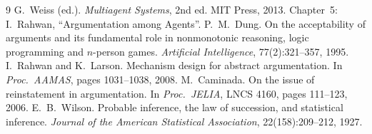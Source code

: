 \documentclass[11pt,a4paper]{article}
\theoremstyle{definition}
\begin{document}
\begin{thebibliography}{9}
 G.~Weiss (ed.). \emph{Multiagent Systems}, 2nd ed. MIT Press, 2013.
  Chapter~5: I.~Rahwan, ``Argumentation among Agents''.
 P.~M.~Dung. On the acceptability of arguments and its fundamental role in
  nonmonotonic reasoning, logic programming and $n$-person games. \emph{Artificial Intelligence},
  77(2):321--357, 1995.
 I.~Rahwan and K.~Larson. Mechanism design for abstract argumentation. In
  \emph{Proc.\ AAMAS}, pages 1031--1038, 2008.
 M.~Caminada. On the issue of reinstatement in argumentation. In \emph{Proc.\
  JELIA}, LNCS 4160, pages 111--123, 2006.
 E.~B.~Wilson. Probable inference, the law of succession, and statistical
  inference. \emph{Journal of the American Statistical Association}, 22(158):209--212, 1927.
\end{thebibliography}
\end{document}
